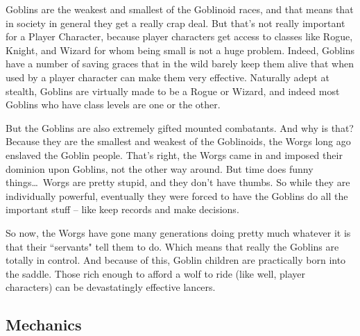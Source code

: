 \vspace*{-8pt}

Goblins are the weakest and smallest of the Goblinoid races, and that means that in society in general they get a really crap deal. But that's not really important for a Player Character, because player characters get access to classes like Rogue, Knight, and Wizard for whom being small is not a huge problem. Indeed, Goblins have a number of saving graces that in the wild barely keep them alive that when used by a player character can make them very effective. Naturally adept at stealth, Goblins are virtually made to be a Rogue or Wizard, and indeed most Goblins who have class levels are one or the other.

But the Goblins are also extremely gifted mounted combatants. And why is that? Because they are the smallest and weakest of the Goblinoids, the Worgs long ago enslaved the Goblin people. That's right, the Worgs came in and imposed their dominion upon Goblins, not the other way around. But time does funny things\ldots\ Worgs are pretty stupid, and they don't have thumbs. So while they are individually powerful, eventually they were forced to have the Goblins do all the important stuff -- like keep records and make decisions.

So now, the Worgs have gone many generations doing pretty much whatever it is that their ``servants" tell them to do. Which means that really the Goblins are totally in control. And because of this, Goblin children are practically born into the saddle. Those rich enough to afford a wolf to ride (like well, player characters) can be devastatingly effective lancers.

\subsection{Mechanics}

